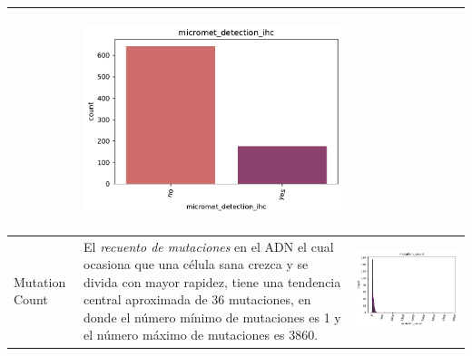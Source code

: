 \begin{table}[!htb]
\begin{threeparttable}
\begin{tabular}{p{2.5cm} p{7.5cm} p{6.5cm}}
			& \begin{center}\includegraphics[width=1\linewidth]{NOTEBOOK/IMAGENES_DESCRIPTIVAS/28_micromet_detection_ihc}\end{center}
			\\ \hline
			
			Mutation Count
			& El \textit{recuento de mutaciones} en el ADN el cual ocasiona que una célula sana  crezca y se divida con mayor rapidez, tiene  una tendencia central aproximada de 36 mutaciones, en donde el número mínimo de mutaciones es 1 y el número máximo de mutaciones es 3860.
			& \begin{center}\includegraphics[width=1\linewidth]{NOTEBOOK/IMAGENES_DESCRIPTIVAS/29_mutation_count}\end{center}
			\\ \hline
		\end{tabular}
	\end{threeparttable}
\end{table}

